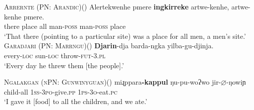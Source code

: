 \documentclass[12pt,egregdoesnotlikesansseriftitles]{scrartcl}
\begin{document}
\begin{exe}
  \ex  \textsc{Arrernte (PN: Arandic)}\hfill (\citealt[132]{wilkins89})
  \gll Alertekwenhe pmere \textbf{ingkirreke} artwe-kenhe, artwe-kenhe pmere.\\
  there place all man-\textsc{poss} man-\textsc{poss} place\\
  \glt `That there (pointing to a particular site) was a place for all men, a men's site.' \label{univex3}
  \ex  \textsc{Garadjari (PN: Marrngu)}\hfill (\citealt[48]{sands89}) 
  \gll \textbf{Djarin}-dja barda-ngka yilba-gu-djinja.\\
  every-\textsc{loc} sun-\textsc{loc}   throw-\textsc{fut}-3.\textsc{pl}\\
  \glt `Every day he threw them [the people].' \label{univex4}

    \ex \textsc{Ngalakgan (nPN: Gunwinyguan)}\hfill (\citealt[160]{baker08}) \label{univex5}
\gll  miɻppara\textbf{-kappul}   ŋu-pu-woʔwo      jir-$\varnothing$-ŋowiɲ\\
       child-all                   1\textsc{ss-3po}-give.\textsc{pp} 1\textsc{ps-3o}-eat.\textsc{pc} \\
         `I gave it [food] to all the children, and we ate.'
\end{exe}
\end{document}
